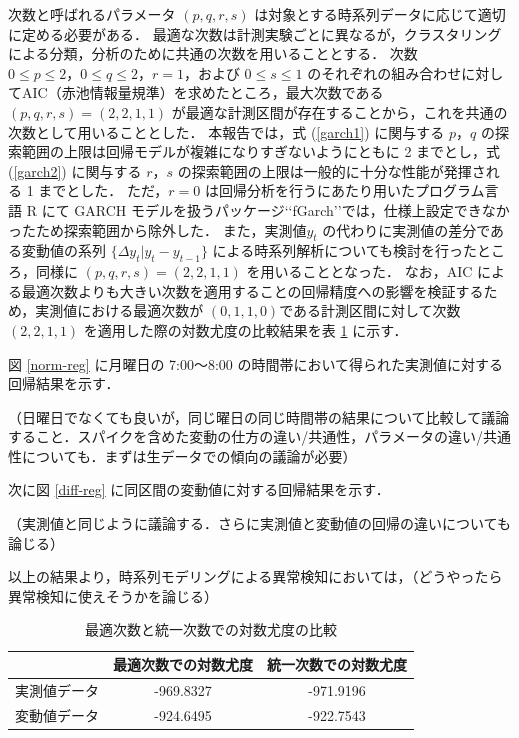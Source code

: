 \documentclass[technicalreport]{ieicej}
\begin{document}
次数と呼ばれるパラメータ $(p,q,r,s)$ は対象とする時系列データに応じて適切に定める必要がある．
最適な次数は計測実験ごとに異なるが，クラスタリングによる分類，分析のために共通の次数を用いることとする．
次数 $0\leq p\leq2，0\leq q\leq 2，r=1$，および $0\leq s\leq 1$ のそれぞれの組み合わせに対してAIC（赤池情報量規準）\cite{aic1}\cite{aic2}を求めたところ，最大次数である $(p,q,r,s)=(2,2,1,1)$ が最適な計測区間が存在することから，これを共通の次数として用いることとした．
本報告では，式 (\ref{garch1}) に関与する $p，q$ の探索範囲の上限は回帰モデルが複雑になりすぎないようにともに 2 までとし，式 (\ref{garch2}) に関与する $r，s$ の探索範囲の上限は一般的に十分な性能が発揮される 1 まで\cite{hansen2005forecast}とした．
ただ，$r = 0$ は回帰分析を行うにあたり用いたプログラム言語 R にて GARCH モデルを扱うパッケージ\lq\lq{fGarch}\rq\rq{}では，仕様上設定できなかったため探索範囲から除外した．
また，実測値$ y_t$ の代わりに実測値の差分である変動値の系列 $\{\Delta y_t | y_t - y_{t-1} \}$ による時系列解析についても検討を行ったところ，同様に $(p,q,r,s)=(2,2,1,1)$ を用いることとなった．
なお，AIC による最適次数よりも大きい次数を適用することの回帰精度への影響を検証するため，実測値における最適次数が $(0,1,1,0) $である計測区間に対して次数 $(2,2,1,1)$ を適用した際の対数尤度の比較結果を表 \ref{more-param} に示す．

図 \ref{norm-reg} に月曜日の 7:00～8:00 の時間帯において得られた実測値に対する回帰結果を示す．

（日曜日でなくても良いが，同じ曜日の同じ時間帯の結果について比較して議論すること．スパイクを含めた変動の仕方の違い/共通性，パラメータの違い/共通性についても．まずは生データでの傾向の議論が必要）

次に図 \ref{diff-reg} に同区間の変動値に対する回帰結果を示す．

（実測値と同じように議論する．さらに実測値と変動値の回帰の違いについても論じる）

以上の結果より，時系列モデリングによる異常検知においては，（どうやったら異常検知に使えそうかを論じる）

\begin{table}[tb]
\centering
\caption{最適次数と統一次数での対数尤度の比較}
\label{more-param}
\begin{tabular}{|l|c|c|}
\hline
&最適次数での対数尤度&統一次数での対数尤度\\
\hline
実測値データ&-969.8327&-971.9196\\
\hline
変動値データ&-924.6495&-922.7543\\
\hline
\end{tabular}
\end{table}
\end{document}
